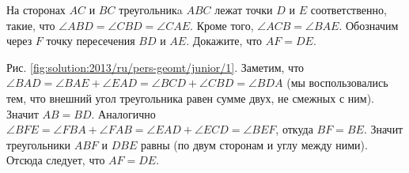 \problem
На сторонах $AC$ и $BC$ треугольникa $ABC$ лежат точки $D$ и $E$
соответственно, такие, что $\angle ABD = \angle CBD = \angle CAE$.
Кроме того, $\angle ACB = \angle BAE$.
Обозначим через $F$ точку пересечения $BD$ и $AE$.
Докажите, что $AF = DE$.

%
\label{solution:2013/ru/pers-geomt/junior/1}
Рис. \ref{fig:solution:2013/ru/pers-geomt/junior/1}.
Заметим, что
\(
    \angle BAD = \angle BAE + \angle EAD
=
    \angle BCD + \angle CBD = \angle BDA
\)
(мы воспользовались тем, что внешний угол треугольника равен сумме двух, не
смежных с ним).
Значит $AB = BD$.
Аналогично
\(
    \angle BFE = \angle FBA + \angle FAB
=
    \angle EAD + \angle ECD = \angle BEF
\), откуда $BF=BE$.
Значит треугольники $ABF$ и $DBE$ равны (по двум сторонам и углу между ними).
Отсюда следует, что $AF = DE$.
\endproblem
